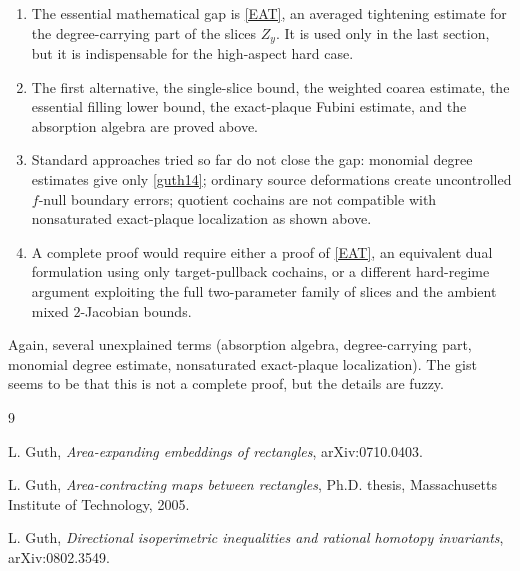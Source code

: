\documentclass[12pt]{article}
\newcommand{\review}[1]{\begin{reviewbox}#1\end{reviewbox}}
\begin{document}
\begin{enumerate}
\item The essential mathematical gap is \eqref{EAT}, an averaged tightening
estimate for the degree-carrying part of the slices \(Z_y\).  It is used only
in the last section, but it is indispensable for the high-aspect hard case.

\item The first alternative, the single-slice bound, the weighted coarea
estimate, the essential filling lower bound, the exact-plaque Fubini estimate,
and the absorption algebra are proved above.

\item Standard approaches tried so far do not close the gap: monomial
degree estimates give only \eqref{guth14}; ordinary source deformations create
uncontrolled \(f\)-null boundary errors; quotient cochains are not compatible
with nonsaturated exact-plaque localization as shown above.

\item A complete proof would require either a proof of \eqref{EAT}, an
equivalent dual formulation using only target-pullback cochains, or a different
hard-regime argument exploiting the full two-parameter family of slices and the
ambient mixed \(2\)-Jacobian bounds.
\end{enumerate}

\review{Again, several unexplained terms (absorption algebra, degree-carrying part, monomial degree estimate, nonsaturated exact-plaque localization). The gist seems to be that this is not a complete proof, but the details are fuzzy.}



\begin{thebibliography}{9}

L. Guth, \emph{Area-expanding embeddings of rectangles}, arXiv:0710.0403.

L. Guth, \emph{Area-contracting maps between rectangles}, Ph.D. thesis,
Massachusetts Institute of Technology, 2005.

L. Guth, \emph{Directional isoperimetric inequalities and rational homotopy
invariants}, arXiv:0802.3549.

\end{thebibliography}
\end{document}
